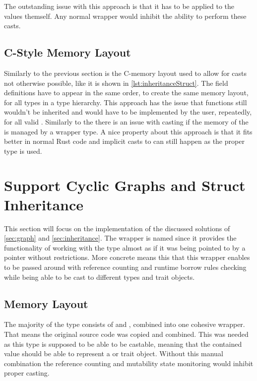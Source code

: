 \documentclass[thesis]{subfiles}
\begin{document}
    The outstanding issue with this approach is that it has to be applied to the values themself.
    Any normal wrapper would inhibit the ability to perform these casts.

  \subsection{C-Style Memory Layout}
    Similarly to the previous section is the C-memory layout used to allow for casts not otherwise possible, like it is shown in \autoref{lst:inheritanceStruct}.
    The field definitions have to appear in the same order, to create the same memory layout, for all types in a type hierarchy\autocite[repr(C)]{rust-nom}.
    This approach has the issue that functions still wouldn't be inherited and would have to be implemented by the user, repeatedly, for all valid \structs.
    Similarly to the \traits there is an issue with casting if the memory of the \struct is managed by a wrapper type.
    A nice property about this approach is that it fits better in normal Rust code and implicit casts to  can still happen as the proper type is used.


\section{Support Cyclic Graphs and Struct Inheritance}
  This section will focus on the implementation of the discussed solutions of \autoref{sec:graph} and \autoref{sec:inheritance}.
  The wrapper is named \PtrT since it provides the functionality of working with the type \T almost as if it was being pointed to by a pointer without restrictions.
  More concrete means this that this wrapper enables \T to be passed around with reference counting and runtime borrow rules checking while being able to be cast to different types and trait objects.

  \subsection{Memory Layout}
    The majority of the \PtrT type consists of \RcT and \RefCellT, combined into one cohesive wrapper.
    That means the original source code was copied and combined.
    This was needed as this type is supposed to be able to be castable, meaning that the contained value should be able to represent a \struct or trait object.
    Without this manual combination the reference counting and mutability state monitoring would inhibit proper casting.
\end{document}
